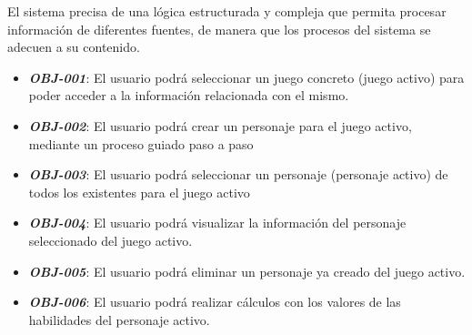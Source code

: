 

        
        

    El sistema precisa de una lógica estructurada y compleja que permita procesar 
    información de diferentes fuentes, de manera que los procesos del sistema se 
    adecuen a su contenido.
    \begin{itemize}
        
        \item \textbf{\textit{OBJ-001}}: El usuario podrá seleccionar un juego concreto 
        (juego activo) para poder acceder a la información relacionada con el mismo.

        \item \textbf{\textit{OBJ-002}}: El usuario podrá crear un personaje para el juego activo,
        mediante un proceso guiado paso a paso
        
        \item \textbf{\textit{OBJ-003}}: El usuario podrá seleccionar un personaje (personaje activo) 
        de todos los existentes para el juego activo
        
        \item \textbf{\textit{OBJ-004}}: El usuario podrá visualizar la información del 
        personaje seleccionado del juego activo.
        
        \item \textbf{\textit{OBJ-005}}: El usuario podrá eliminar un personaje ya creado 
        del juego activo.
        
        \item \textbf{\textit{OBJ-006}}: El usuario podrá realizar cálculos con los valores 
        de las habilidades del personaje activo.

    \end{itemize}


